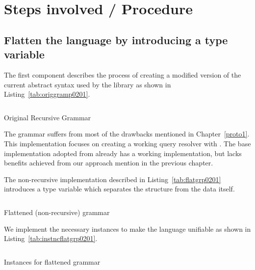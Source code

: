 \documentclass[thesis-solanki.tex]{subfiles}
\begin{document}
\section{Steps involved / Procedure}


\subsection{Flatten the language by introducing a type variable}
The first component describes the process of creating a modified version of the current abstract syntax used by the library as shown in Listing~\ref{tab:origgramp0201}.

\begin{code-list}[H]
	\begin{singlespace}
	\inputminted[linenos]{haskell}{haskell-proto2-original-grammar.hs}
	\end{singlespace}
	\caption{Original Recursive Grammar}
\label{tab:origgramp0201}
\end{code-list}

The grammar suffers from most of the drawbacks mentioned in Chapter~\ref{proto1}. This implementation focuses on creating a working  
 query resolver with  . The base implementation 
adopted from  \cite{prolog-lib} already has a working implementation, but lacks benefits achieved from
our approach mention in the previous chapter.

The non-recursive implementation described in Listing~\ref{tab:flatgrp0201} introduces a type variable which separates the structure from 
the data itself.

\begin{code-list}[H]
  \begin{singlespace}
    \inputminted[linenos]{haskell}{haskell-proto2-flattened-rarefy.hs}
  \end{singlespace}
  \caption{Flattened (non-recursive) grammar}
\label{tab:flatgrp0201}
\end{code-list}

We implement the necessary instances to make the language unifiable as shown in Listing~\ref{tab:instncflatgrp0201}.
\begin{code-list}[H]
  \begin{singlespace}
    \inputminted[linenos]{haskell}{haskell-proto2-flattened-instances.hs}
  \end{singlespace}
  \caption{Instances for flattened grammar}
\label{tab:instncflatgrp0201}
\end{code-list}
\end{document}
